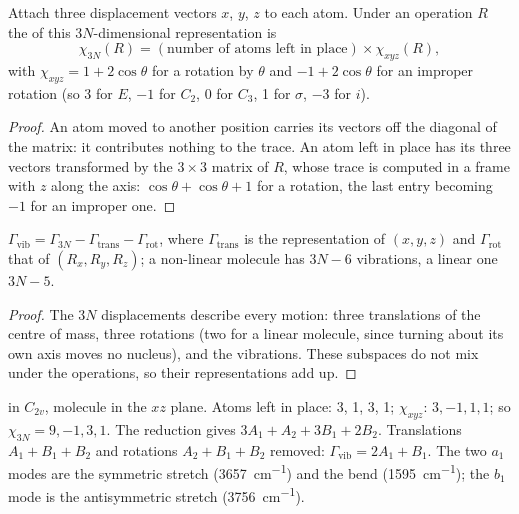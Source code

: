 \begin{proposition}\label{prop:b3:group-theory-applied:gamma-3n}
Attach three displacement vectors $x$, $y$, $z$ to each atom. Under an operation
$R$ the  of this $3N$-dimensional representation is
\[
\chi_{3N}(R) = (\text{number of atoms left in place}) \times \chi_{xyz}(R),
\]
with $\chi_{xyz} = 1 + 2\cos\theta$ for a rotation by $\theta$ and $-1 + 2\cos\theta$
for an improper rotation (so 3 for $E$, $-1$ for $C_2$, 0 for $C_3$, 1 for $\sigma$,
$-3$ for $i$).
\end{proposition}

\begin{proof}
An atom moved to another position carries its vectors off the diagonal of
the matrix: it contributes nothing to the trace. An atom left in place has
its three vectors transformed by the $3\times3$ matrix of $R$, whose trace is
computed in a frame with $z$ along the axis: $\cos\theta + \cos\theta + 1$ for a
rotation, the last entry becoming $-1$ for an improper one.
\end{proof}

\begin{proposition}\label{prop:b3:group-theory-applied:mode-count}
$\Gamma_{\mathrm{vib}} = \Gamma_{3N} - \Gamma_{\mathrm{trans}} - \Gamma_{\mathrm{rot}}$, where
$\Gamma_{\mathrm{trans}}$ is the representation of $(x, y, z)$ and $\Gamma_{\mathrm{rot}}$ that
of $(R_x, R_y, R_z)$; a non-linear molecule has $3N - 6$ vibrations, a linear
one $3N - 5$.
\end{proposition}

\begin{proof}
The $3N$ displacements describe every motion: three translations of the
centre of mass, three rotations (two for a linear molecule, since turning
about its own axis moves no nucleus), and the vibrations. These subspaces do
not mix under the operations, so their representations add up.
\end{proof}

\begin{example}[Water]\label{ex:b3:group-theory-applied:water}
 in $C_{2v}$, molecule in the $xz$ plane. Atoms left in place: 3, 1, 3, 1;
$\chi_{xyz}$: $3, -1, 1, 1$; so $\chi_{3N} = 9, -1, 3, 1$. The reduction gives $3A_1 +
A_2 + 3B_1 + 2B_2$. Translations $A_1 + B_1 + B_2$ and rotations $A_2 + B_1 + B_2$
removed: $\Gamma_{\mathrm{vib}} = 2A_1 + B_1$. The two $a_1$ modes are the symmetric
stretch (\qty{3657}{cm^{-1}}) and the bend (\qty{1595}{cm^{-1}}); the $b_1$ mode is
the antisymmetric stretch (\qty{3756}{cm^{-1}}).
\end{example}

